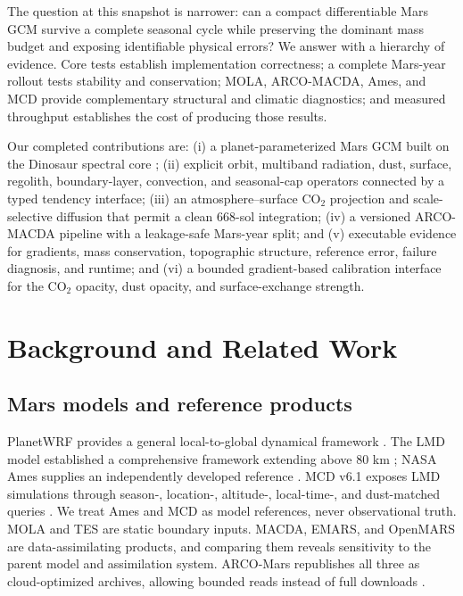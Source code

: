 \documentclass{article}
\begin{document}
The question at this snapshot is narrower: can a compact differentiable Mars GCM
survive a complete seasonal cycle while preserving the dominant mass budget and
exposing identifiable physical errors? We answer with a hierarchy of evidence.
Core tests establish implementation correctness; a complete Mars-year rollout
tests stability and conservation; MOLA, ARCO-MACDA, Ames, and MCD provide
complementary structural and climatic diagnostics; and measured throughput
establishes the cost of producing those results.

Our completed contributions are: (i) a planet-parameterized Mars GCM built on the
Dinosaur spectral core \citep{dinosaur2024}; (ii) explicit orbit,
multiband radiation, dust, surface, regolith, boundary-layer, convection, and
seasonal-cap operators connected by a typed tendency interface; (iii) an
atmosphere--surface \(\mathrm{CO_2}\) projection and scale-selective diffusion
that permit a clean 668-sol integration; (iv) a versioned ARCO-MACDA pipeline
with a leakage-safe Mars-year split; and (v) executable evidence for gradients,
mass conservation, topographic structure, reference error, failure diagnosis,
and runtime; and (vi) a bounded gradient-based calibration interface for the
CO$_2$ opacity, dust opacity, and surface-exchange strength.

\section{Background and Related Work}

\subsection{Mars models and reference products}
PlanetWRF provides a general local-to-global dynamical framework
\citep{richardson2007planetwrf}. The LMD model established a comprehensive
framework extending above 80 km \citep{forget1999improved}; NASA Ames supplies
an independently developed reference \citep{haberle2019ames}. MCD v6.1 exposes LMD simulations through
season-, location-, altitude-, local-time-, and dust-matched queries
\citep{mcd61}. We treat Ames and MCD as model references, never observational
truth. MOLA and TES are static boundary inputs. MACDA, EMARS, and OpenMARS are
data-assimilating products, and comparing them reveals sensitivity to the parent
model and assimilation system. ARCO-Mars republishes all three as cloud-optimized
archives, allowing bounded reads instead of full downloads
\citep{bhattacharya2026arcomars}.
\end{document}
